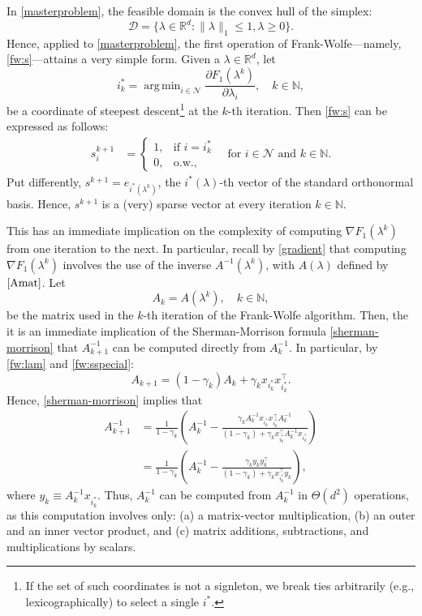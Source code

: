 \documentclass[11pt, oneside]{article}
\newcommand{\reals}{\ensuremath{\mathbb{R}}}
\newcommand{\naturals}{\ensuremath{\mathbb{N}}}
\newcommand{\argmin}{\mathop{\arg\,\min}}
\begin{document}
In \eqref{masterproblem}, the feasible domain is the convex hull of the simplex:
$$\mathcal{D}= \{ \lambda\in \reals^d: \|\lambda\|_1\leq 1, \lambda\geq 0 \}. $$
 Hence, applied to \eqref{masterproblem}, the first operation of Frank-Wolfe---namely, \eqref{fw:s}---attains a very simple form. Given a $\lambda\in\reals^d$, let
 $$i^*_k=\argmin_{i\in \mathcal {N}} \frac{\partial F_1(\lambda^k)}{\partial \lambda_i}, \quad k\in \naturals,$$ 
be  a coordinate of steepest descent\footnote{If the set of such coordinates is not a signleton, we break ties arbitrarily (e.g., lexicographically) to select a single $i^*$.} at the $k$-th iteration. Then \eqref{fw:s} can be expressed as follows: 
\begin{align}\label{fw:sspecial}
s^{k+1}_i & =\begin{cases} 1, & \text{if }i=i^*_k\\ 0, &\text{o.w.},\end{cases}\quad \text{for }i\in\mathcal{N}\text{ and }k\in\naturals. 
\end{align}
Put differently, $s^{k+1}=e_{i^*(\lambda^k)}$, the $i^*(\lambda)$-th vector of the standard orthonormal basis. Hence, $s^{k+1}$ is a (very) sparse vector at every iteration $k\in \naturals$.

This has an immediate implication on the complexity of computing $\nabla F_1(\lambda^k)$ from one iteration to the next. In particular, recall by \eqref{gradient} that computing $\nabla F_1(\lambda^k)$ involves the use of the inverse $A^{-1}(\lambda^k)$, with $A(\lambda)$ defined by $\eqref{Amat}$. Let
$$A_k = A(\lambda^k), \quad k \in \naturals, $$ 
be the matrix used in the $k$-th iteration of the Frank-Wolfe algorithm. %
 Then, the it is an immediate implication of the Sherman-Morrison formula \eqref{sherman-morrison} that $A^{-1}_{k+1}$ can be computed directly from $A^{-1}_k$. In particular, by \eqref{fw:lam} and \eqref{fw:sspecial}:
$$A_{k+1} = (1-\gamma_k) A_k + \gamma_k x_{i^*_k} x_{i^*_k}^\top. $$
Hence, \eqref{sherman-morrison} implies that
\begin{align*}A_{k+1}^{-1} & = \frac{1}{1-\gamma_k} \left(   A^{-1}_k - \frac{\gamma_k A^{-1}_kx_{i^*_k} x_{i^*_k}^\top A^{-1}_k  }{ (1-\gamma_k)+ \gamma_k  x_{i^*_k}^{\top} A^{-1}_k x_{i^*_k} } \right)\\
&=  \frac{1}{1-\gamma_k} \left(   A^{-1}_k - \frac{\gamma_k y_ky_k^\top  }{ (1-\gamma_k)+ \gamma_k  x_{i^*_k}^{\top} y_k } \right), \end{align*}
where $y_k \equiv A^{-1}_kx_{i^*_k}.$
Thus, $A_k^{-1}$ can be computed from $A_k^{-1}$ in $\Theta(d^2)$ operations, as this computation involves only: (a) a matrix-vector multiplication, (b) an outer and an inner vector product, and (c) matrix additions, subtractions, and multiplications by scalars. 
\end{document}
